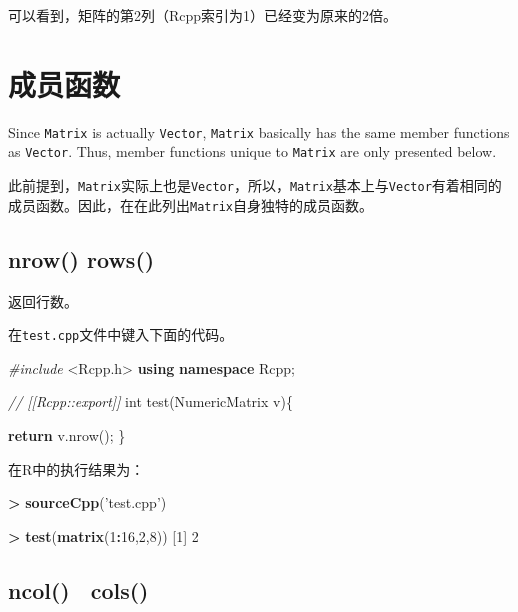 \documentclass[]{ctexbook}
\newenvironment{Shaded}{\begin{snugshade}}{\end{snugshade}}
\newcommand{\KeywordTok}[1]{\textcolor[rgb]{0.13,0.29,0.53}{\textbf{#1}}}
\newcommand{\DataTypeTok}[1]{\textcolor[rgb]{0.13,0.29,0.53}{#1}}
\newcommand{\DecValTok}[1]{\textcolor[rgb]{0.00,0.00,0.81}{#1}}
\newcommand{\StringTok}[1]{\textcolor[rgb]{0.31,0.60,0.02}{#1}}
\newcommand{\ImportTok}[1]{#1}
\newcommand{\CommentTok}[1]{\textcolor[rgb]{0.56,0.35,0.01}{\textit{#1}}}
\newcommand{\ControlFlowTok}[1]{\textcolor[rgb]{0.13,0.29,0.53}{\textbf{#1}}}
\newcommand{\OperatorTok}[1]{\textcolor[rgb]{0.81,0.36,0.00}{\textbf{#1}}}
\newcommand{\PreprocessorTok}[1]{\textcolor[rgb]{0.56,0.35,0.01}{\textit{#1}}}
\newcommand{\NormalTok}[1]{#1}
\begin{document}
可以看到，矩阵的第2列（Rcpp索引为1）已经变为原来的2倍。

\section{成员函数}\label{Member-functions-matrix}

Since \texttt{Matrix} is actually \texttt{Vector}, \texttt{Matrix}
basically has the same member functions as \texttt{Vector}. Thus, member
functions unique to \texttt{Matrix} are only presented below.

此前提到，\texttt{Matrix}实际上也是\texttt{Vector}，所以，\texttt{Matrix}基本上与\texttt{Vector}有着相同的成员函数。因此，在在此列出\texttt{Matrix}自身独特的成员函数。

\subsection{nrow() rows()}\label{nrow-rows}

返回行数。

在\texttt{test.cpp}文件中键入下面的代码。

\begin{Shaded}
\begin{Highlighting}[]
\PreprocessorTok{#include }\ImportTok{<Rcpp.h>}
\KeywordTok{using} \KeywordTok{namespace}\NormalTok{ Rcpp;}

\CommentTok{// [[Rcpp::export]]}
\DataTypeTok{int}\NormalTok{ test(NumericMatrix v)\{}

    \ControlFlowTok{return}\NormalTok{ v.nrow();}
\NormalTok{\}}
\end{Highlighting}
\end{Shaded}

在R中的执行结果为：

\begin{Shaded}
\begin{Highlighting}[]
\OperatorTok{>}\StringTok{ }\KeywordTok{sourceCpp}\NormalTok{(}\StringTok{'test.cpp'}\NormalTok{)}

\OperatorTok{>}\StringTok{ }\KeywordTok{test}\NormalTok{(}\KeywordTok{matrix}\NormalTok{(}\DecValTok{1}\OperatorTok{:}\DecValTok{16}\NormalTok{,}\DecValTok{2}\NormalTok{,}\DecValTok{8}\NormalTok{))}
\NormalTok{[}\DecValTok{1}\NormalTok{] }\DecValTok{2}
\end{Highlighting}
\end{Shaded}

\subsection{ncol()　cols()}\label{ncol-cols}
\end{document}
